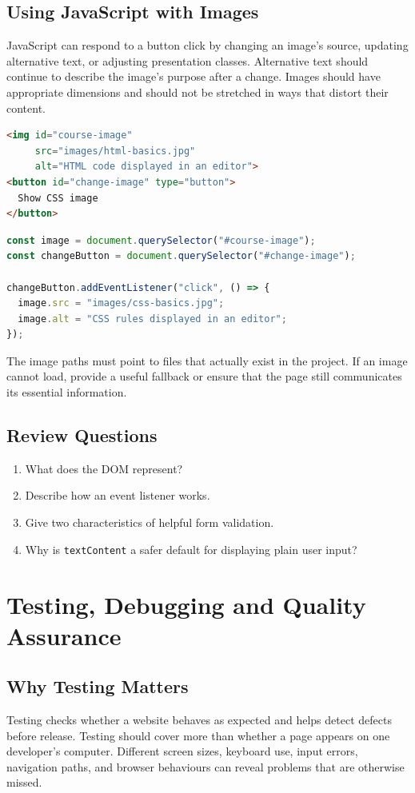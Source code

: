 \documentclass[11pt,openany,oneside]{book}
\begin{document}
\section{Using JavaScript with Images}
JavaScript can respond to a button click by changing an image's source, updating alternative text, or adjusting presentation classes. Alternative text should continue to describe the image's purpose after a change. Images should have appropriate dimensions and should not be stretched in ways that distort their content.

\begin{lstlisting}[style=webcode,language=HTML]
<img id="course-image"
     src="images/html-basics.jpg"
     alt="HTML code displayed in an editor">
<button id="change-image" type="button">
  Show CSS image
</button>
\end{lstlisting}

\begin{lstlisting}[style=webcode,language=JavaScript]
const image = document.querySelector("#course-image");
const changeButton = document.querySelector("#change-image");

changeButton.addEventListener("click", () => {
  image.src = "images/css-basics.jpg";
  image.alt = "CSS rules displayed in an editor";
});
\end{lstlisting}
The image paths must point to files that actually exist in the project. If an image cannot load, provide a useful fallback or ensure that the page still communicates its essential information.

\section*{Review Questions}
\begin{enumerate}
\item What does the DOM represent?
\item Describe how an event listener works.
\item Give two characteristics of helpful form validation.
\item Why is \texttt{textContent} a safer default for displaying plain user input?
\end{enumerate}

\chapter{Testing, Debugging and Quality Assurance}
\section{Why Testing Matters}
Testing checks whether a website behaves as expected and helps detect defects before release. Testing should cover more than whether a page appears on one developer's computer. Different screen sizes, keyboard use, input errors, navigation paths, and browser behaviours can reveal problems that are otherwise missed.
\end{document}
